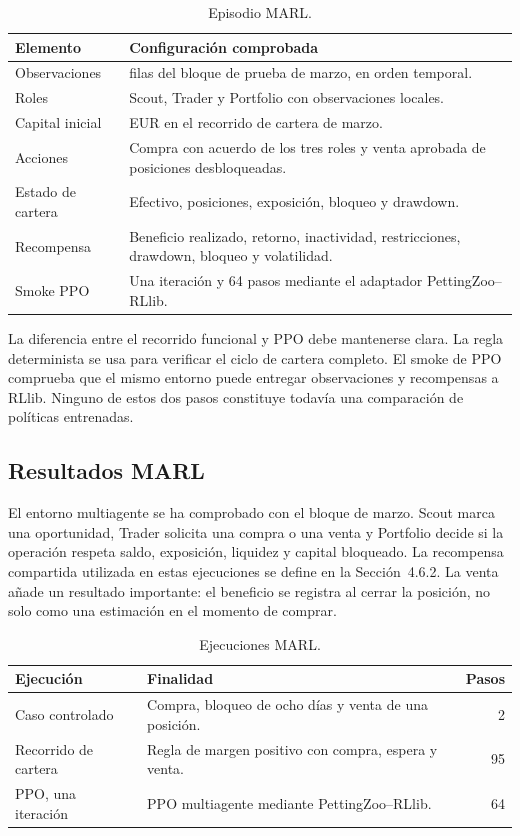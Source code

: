 \begin{table}[htbp]
\centering
\begin{tabularx}{\textwidth}{>{\raggedright\arraybackslash}p{} >{\raggedright\arraybackslash}X}
\toprule
Elemento & Configuración comprobada \\
\midrule
Observaciones & 95 filas del bloque de prueba de marzo, en orden temporal. \\
Roles & Scout, Trader y Portfolio con observaciones locales. \\
Capital inicial & 1.000 EUR en el recorrido de cartera de marzo. \\
Acciones & Compra con acuerdo de los tres roles y venta aprobada de posiciones desbloqueadas. \\
Estado de cartera & Efectivo, posiciones, exposición, bloqueo y drawdown. \\
Recompensa & Beneficio realizado, retorno, inactividad, restricciones, drawdown, bloqueo y volatilidad. \\
Smoke PPO & Una iteración y 64 pasos mediante el adaptador PettingZoo--RLlib. \\
\bottomrule
\end{tabularx}
\caption{Episodio MARL.}
\label{tab:protocolo-marl}
\end{table}

La diferencia entre el recorrido funcional y PPO debe mantenerse clara. La regla determinista se usa para verificar el ciclo de cartera completo. El smoke de PPO comprueba que el mismo entorno puede entregar observaciones y recompensas a RLlib. Ninguno de estos dos pasos constituye todavía una comparación de políticas entrenadas.

\subsection{Resultados MARL}

El entorno multiagente se ha comprobado con el bloque de marzo. Scout marca una oportunidad, Trader solicita una compra o una venta y Portfolio decide si la operación respeta saldo, exposición, liquidez y capital bloqueado. La recompensa compartida utilizada en estas ejecuciones se define en la Sección~4.6.2. La venta añade un resultado importante: el beneficio se registra al cerrar la posición, no solo como una estimación en el momento de comprar.

\begin{table}[H]
\centering
\begin{tabularx}{\textwidth}{>{\raggedright\arraybackslash}p{} >{\raggedright\arraybackslash}X r}
\toprule
Ejecución & Finalidad & Pasos \\
\midrule
Caso controlado & Compra, bloqueo de ocho días y venta de una posición. & 2 \\
Recorrido de cartera & Regla de margen positivo con compra, espera y venta. & 95 \\
PPO, una iteración & PPO multiagente mediante PettingZoo--RLlib. & 64 \\
\bottomrule
\end{tabularx}
\caption{Ejecuciones MARL.}
\label{tab:marl-inicial}
\end{table}

